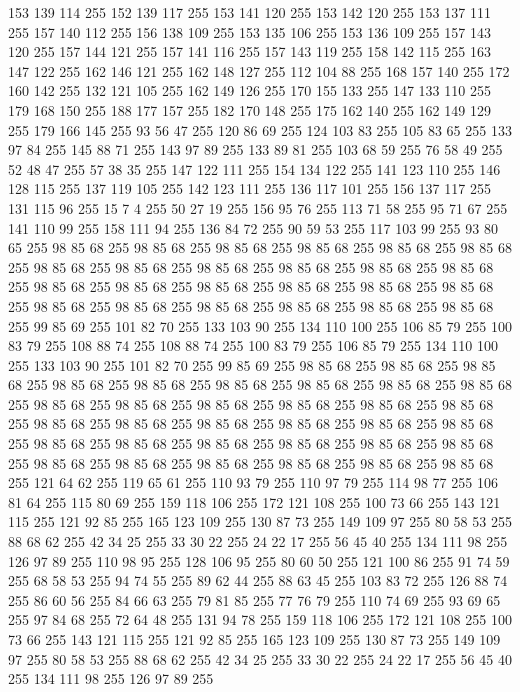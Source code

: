 153 139 114 255 152 139 117 255 153 141 120 255 153 142 120 255 153 137 111 255 157 140 112 255 156 138 109 255 153 135 106 255 153 136 109 255 157 143 120 255 157 144 121 255 157 141 116 255 157 143 119 255 158 142 115 255 163 147 122 255 162 146 121 255 162 148 127 255 112 104 88 255 168 157 140 255 172 160 142 255 132 121 105 255 162 149 126 255 170 155 133 255 147 133 110 255 179 168 150 255 188 177 157 255 182 170 148 255 175 162 140 255 162 149 129 255 179 166 145 255 93 56 47 255 120 86 69 255 124 103 83 255 105 83 65 255 133 97 84 255 145 88 71 255 143 97 89 255 133 89 81 255 103 68 59 255 76 58 49 255 52 48 47 255 57 38 35 255 147 122 111 255 154 134 122 255 141 123 110 255 146 128 115 255 137 119 105 255 142 123 111 255 136 117 101 255 156 137 117 255 131 115 96 255 15 7 4 255 50 27 19 255 156 95 76 255 113 71 58 255 95 71 67 255 141 110 99 255 158 111 94 255 136 84 72 255 90 59 53 255 117 103 99 255 93 80 65 255 98 85 68 255 98 85 68 255
98 85 68 255 98 85 68 255 98 85 68 255 98 85 68 255 98 85 68 255 98 85 68 255 98 85 68 255 98 85 68 255 98 85 68 255 98 85 68 255 98 85 68 255 98 85 68 255 98 85 68 255 98 85 68 255 98 85 68 255 98 85 68 255 98 85 68 255 98 85 68 255 98 85 68 255 98 85 68 255 98 85 68 255 98 85 68 255 99 85 69 255 101 82 70 255 133 103 90 255 134 110 100 255 106 85 79 255 100 83 79 255 108 88 74 255 108 88 74 255 100 83 79 255 106 85 79 255 134 110 100 255 133 103 90 255 101 82 70 255 99 85 69 255 98 85 68 255 98 85 68 255 98 85 68 255 98 85 68 255 98 85 68 255 98 85 68 255 98 85 68 255 98 85 68 255 98 85 68 255 98 85 68 255 98 85 68 255 98 85 68 255 98 85 68 255 98 85 68 255 98 85 68 255 98 85 68 255 98 85 68 255 98 85 68 255 98 85 68 255 98 85 68 255 98 85 68 255 98 85 68 255 98 85 68 255 98 85 68 255 98 85 68 255 98 85 68 255 98 85 68 255 98 85 68 255
98 85 68 255 98 85 68 255 98 85 68 255 98 85 68 255 98 85 68 255 121 64 62 255 119 65 61 255 110 93 79 255 110 97 79 255 114 98 77 255 106 81 64 255 115 80 69 255 159 118 106 255 172 121 108 255 100 73 66 255 143 121 115 255 121 92 85 255 165 123 109 255 130 87 73 255 149 109 97 255 80 58 53 255 88 68 62 255 42 34 25 255 33 30 22 255 24 22 17 255 56 45 40 255 134 111 98 255 126 97 89 255 110 98 95 255 128 106 95 255 80 60 50 255 121 100 86 255 91 74 59 255 68 58 53 255 94 74 55 255 89 62 44 255 88 63 45 255 103 83 72 255 126 88 74 255 86 60 56 255 84 66 63 255 79 81 85 255 77 76 79 255 110 74 69 255 93 69 65 255 97 84 68 255 72 64 48 255 131 94 78 255 159 118 106 255 172 121 108 255 100 73 66 255 143 121 115 255 121 92 85 255 165 123 109 255 130 87 73 255 149 109 97 255 80 58 53 255 88 68 62 255 42 34 25 255 33 30 22 255 24 22 17 255 56 45 40 255 134 111 98 255 126 97 89 255

